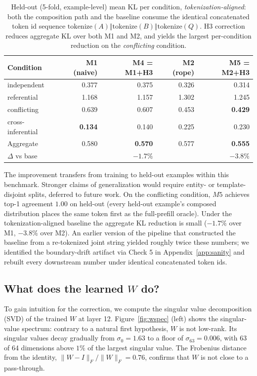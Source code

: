 \begin{table}[t]
\centering
\caption{Held-out (5-fold, example-level) mean KL per condition, \emph{tokenization-aligned}: both the composition path and the baseline consume the identical concatenated token id sequence $\mathrm{tokenize}(A) \Vert \mathrm{tokenize}(B) \Vert \mathrm{tokenize}(Q)$. H3 correction reduces aggregate KL over both M1 and M2, and yields the largest per-condition reduction on the \emph{conflicting} condition.}
\label{tab:holdout}
\begin{tabular}{lrrrr}
\toprule
Condition & M1 (naive) & M4 = M1+H3 & M2 (rope) & M5 = M2+H3 \\
\midrule
independent        & 0.377 & 0.375 & 0.326 & 0.314 \\
referential        & 1.168 & 1.157 & 1.302 & 1.245 \\
conflicting        & 0.639 & 0.607 & 0.453 & \textbf{0.429} \\
cross-inferential  & \textbf{0.134} & 0.140 & 0.225 & 0.230 \\
\midrule
Aggregate          & 0.580 & \textbf{0.570} & 0.577 & \textbf{0.555} \\
$\Delta$ vs base   &       & $-1.7\%$ &       & $-3.8\%$ \\
\bottomrule
\end{tabular}
\end{table}

The improvement transfers from training to held-out examples within this benchmark. Stronger claims of generalization would require entity- or template-disjoint splits, deferred to future work. On the conflicting condition, $M5$ achieves top-1 agreement $1.00$ on held-out (every held-out example's composed distribution places the same token first as the full-prefill oracle). Under the tokenization-aligned baseline the aggregate KL reduction is small ($-1.7\%$ over M1, $-3.8\%$ over M2). An earlier version of the pipeline that constructed the baseline from a re-tokenized joint string yielded roughly twice these numbers; we identified the boundary-drift artifact via Check 5 in Appendix~\ref{app:sanity} and rebuilt every downstream number under identical concatenated token ids.

\subsection{What does the learned $W$ do?}\label{sec:interp}

To gain intuition for the correction, we compute the singular value decomposition (SVD) of the trained $W$ at layer 12. Figure~\ref{fig:wspec} (left) shows the singular-value spectrum: contrary to a natural first hypothesis, $W$ is not low-rank. Its singular values decay gradually from $\sigma_0 = 1.63$ to a floor of $\sigma_{63} = 0.006$, with 63 of 64 dimensions above $1\%$ of the largest singular value. The Frobenius distance from the identity, $\lVert W - I \rVert_F / \lVert W \rVert_F = 0.76$, confirms that $W$ is not close to a pass-through.

